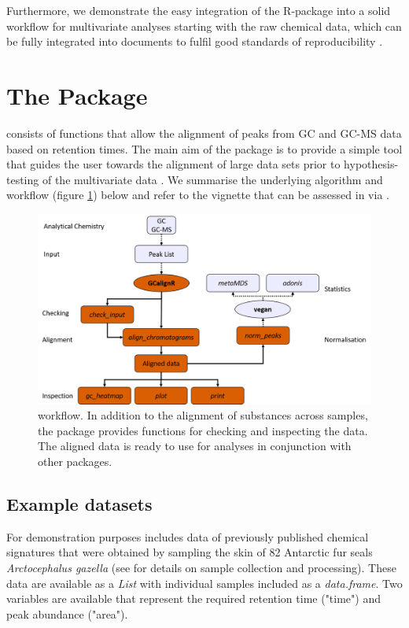 Furthermore, we demonstrate the easy integration of the R-package \href{https://cran.r-project.org/web/packages/vegan/index.html}{} \citep{Oksanen.2016} into a solid workflow for multivariate analyses starting with the raw chemical data, which can be fully integrated into  documents \citep{Allaire.2016} to fulfil good standards of reproducibility \citep{Peng.2011}.

\section{The Package}
 consists of functions that allow the alignment of peaks from GC and GC-MS data based on retention times. The main aim of the package is to provide a simple tool that guides the user towards the alignment of large data sets prior to hypothesis-testing of the multivariate data \citep{Anderson.2001}. We summarise the underlying algorithm and workflow (figure \ref{figure:workflow}) below and refer to the vignette that can be assessed in  via .

\begin{figure}[htbp]
  \centering
  \includegraphics[width=13cm]{figures/workflow}
  \caption{ workflow. In addition to the alignment of substances across samples, the package provides functions for checking and inspecting the data. The aligned data is ready to use for analyses in conjunction with other packages.}
  \label{figure:workflow}
\end{figure}

\subsection{Example datasets}
For demonstration purposes  includes data of previously published chemical signatures that were obtained by sampling the skin of 82 Antarctic fur seals \textit{Arctocephalus gazella} (see \cite{Stoffel.2015} for details on sample collection and processing). These data are available as a \emph{List} with individual samples included as a \emph{data.frame}. Two variables are available that represent the required retention time ("time") and peak abundance ("area"). 

